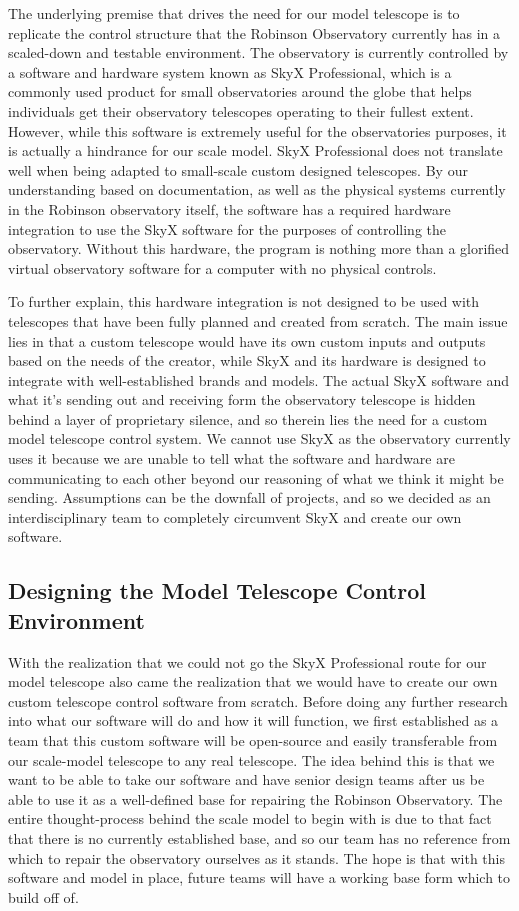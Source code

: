 \documentclass[12pt]{report}
\begin{document}
The underlying premise that drives the need for our model telescope is to replicate the control structure that the Robinson Observatory currently has in a scaled-down and testable environment. The observatory is currently controlled by a software and hardware system known as SkyX Professional, which is a commonly used product for small observatories around the globe that helps individuals get their observatory telescopes operating to their fullest extent. However, while this software is extremely useful for the observatories purposes, it is actually a hindrance for our scale model. SkyX Professional does not translate well when being adapted to small-scale custom designed telescopes. By our understanding based on documentation, as well as the physical systems currently in the Robinson observatory itself, the software has a required hardware integration to use the SkyX software for the purposes of controlling the observatory. Without this hardware, the program is nothing more than a glorified virtual observatory software for a computer with no physical controls.

To further explain, this hardware integration is not designed to be used with telescopes that have been fully planned and created from scratch. The main issue lies in that a custom telescope would have its own custom inputs and outputs based on the needs of the creator, while SkyX and its hardware is designed to integrate with well-established brands and models. The actual SkyX software and what it’s sending out and receiving form the observatory telescope is hidden behind a layer of proprietary silence, and so therein lies the need for a custom model telescope control system. We cannot use SkyX as the observatory currently uses it because we are unable to tell what the software and hardware are communicating to each other beyond our reasoning of what we think it might be sending. Assumptions can be the downfall of projects, and so we decided as an interdisciplinary team to completely circumvent SkyX and create our own software.

\subsection*{Designing the Model Telescope Control Environment}

With the realization that we could not go the SkyX Professional route for our model telescope also came the realization that we would have to create our own custom telescope control software from scratch. Before doing any further research into what our software will do and how it will function, we first established as a team that this custom software will be open-source and easily transferable from our scale-model telescope to any real telescope. The idea behind this is that we want to be able to take our software and have senior design teams after us be able to use it as a well-defined base for repairing the Robinson Observatory. The entire thought-process behind the scale model to begin with is due to that fact that there is no currently established base, and so our team has no reference from which to repair the observatory ourselves as it stands. The hope is that with this software and model in place, future teams will have a working base form which to build off of.
\end{document}
